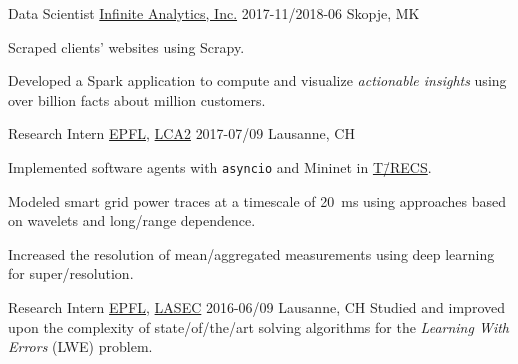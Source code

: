 \documentclass[%
version=last,%
fontsize=11pt,%
paper=A4,%
areasetadvanced,%
headinclude=false,%
footinclude=false,%
headlines=0,%
footlines=0,%
toc=bibnumbered,%
]{scrartcl}
\begin{document}
\begin{minipage}[t]{0.575\textwidth}
  \WorkEntry%
  {Data Scientist}%
  {\href{http://infiniteanalytics.com/}{Infinite Analytics, Inc.}}%
  {2017-11/2018-06}%
  {Skopje, MK}%
  {%
    \begin{Items}
    \item Scraped clients’ websites using Scrapy.
    \item Developed a Spark application to compute and visualize
      \emph{actionable insights} using over  billion facts about
       million customers.
    \end{Items}%
  }

  \WorkEntry%
  {Research Intern}%
  {\href{https://epfl.ch/}{EPFL}, \href{http://lca.epfl.ch/}{LCA2}}%
  {2017-07/09}%
  {Lausanne, CH}%
  {%
    \begin{Items}
    \item Implemented software agents with \texttt{asyncio} and
      Mininet in
      \href{https://www.epfl.ch/labs/desl-pwrs/smartgrid/t-recs/}{T\=/RECS}.
    \item Modeled smart grid power traces at a timescale of \SI{20}{\ms} using
      approaches based on wavelets and long\-/range dependence.
    \item Increased the resolution of mean\-/aggregated measurements using deep
      learning for super\-/resolution.
    \end{Items}%
  }

  \WorkEntry%
  {Research Intern}%
  {\href{https://epfl.ch/}{EPFL}, \href{https://lasec.epfl.ch/}{LASEC}}%
  {2016-06/09}%
  {Lausanne, CH}%
  {%
    Studied and improved upon the complexity of state\-/of\-/the\-/art solving
    algorithms for the \emph{Learning With Errors} (LWE) problem.%
  }
\end{minipage}%
\hfill%
\end{document}

